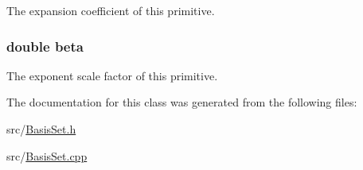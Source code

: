 The expansion coefficient of this primitive. \hypertarget{classJKBuilder_1_1Primitive_a9424343761f8c4f4c1afe8f5b6bf471b}{
\subsubsection[{beta}]{\setlength{\rightskip}{0pt plus 5cm}double {\bf beta}}}
\label{classJKBuilder_1_1Primitive_a9424343761f8c4f4c1afe8f5b6bf471b}


The exponent scale factor of this primitive. 

The documentation for this class was generated from the following files:\begin{DoxyCompactItemize}
\item 
src/\hyperlink{BasisSet_8h}{BasisSet.h}\item 
src/\hyperlink{BasisSet_8cpp}{BasisSet.cpp}\end{DoxyCompactItemize}
